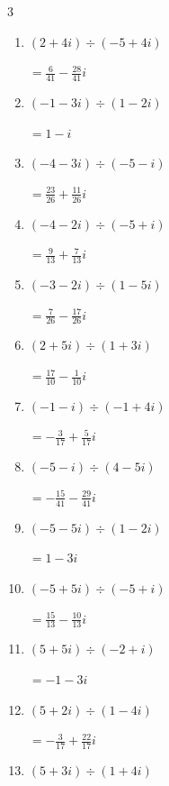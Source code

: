 \begin{multicols}{3}
\begin{enumerate}
  \item $\displaystyle (2+4i)\div(-5+4i)$

        $\displaystyle =\frac{6}{41}-\frac{28}{41}i$

  \item $\displaystyle (-1-3i)\div(1-2i)$

        $\displaystyle =1-i$

  \item $\displaystyle (-4-3i)\div(-5-i)$

        $\displaystyle =\frac{23}{26}+\frac{11}{26}i$

  \item $\displaystyle (-4-2i)\div(-5+i)$

        $\displaystyle =\frac{9}{13}+\frac{7}{13}i$

  \item $\displaystyle (-3-2i)\div(1-5i)$

        $\displaystyle =\frac{7}{26}-\frac{17}{26}i$

\columnbreak %

  \item $\displaystyle (2+5i)\div(1+3i)$

        $\displaystyle =\frac{17}{10}-\frac{1}{10}i$

  \item $\displaystyle (-1-i)\div(-1+4i)$

        $\displaystyle =-\frac{3}{17}+\frac{5}{17}i$

  \item $\displaystyle (-5-i)\div(4-5i)$

        $\displaystyle =-\frac{15}{41}-\frac{29}{41}i$

  \item $\displaystyle (-5-5i)\div(1-2i)$

        $\displaystyle =1-3i$

  \item $\displaystyle (-5+5i)\div(-5+i)$

        $\displaystyle =\frac{15}{13}-\frac{10}{13}i$

  \item $\displaystyle (5+5i)\div(-2+i)$

        $\displaystyle =-1-3i$

  \item $\displaystyle (5+2i)\div(1-4i)$

        $\displaystyle =-\frac{3}{17}+\frac{22}{17}i$

  \item $\displaystyle (5+3i)\div(1+4i)$


\end{enumerate}
\end{multicols}
